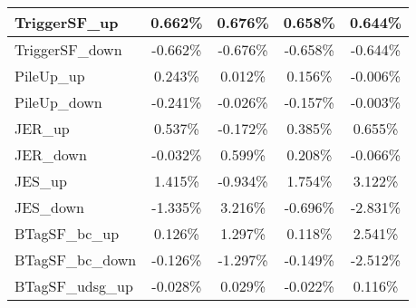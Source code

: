 \begin{table}[]
{\begin{tabular}{|l|c|c|c|c|}
TriggerSF\_up                               & 0.662\%                                & 0.676\%                                & 0.658\%                               & 0.644\%                                \\ \hline 
TriggerSF\_down                             & -0.662\%                              & -0.676\%                              & -0.658\%                             & -0.644\%                              \\ \hline 
PileUp\_up                             & 0.243\%                              & 0.012\%                              & 0.156\%                             & -0.006\%                              \\ \hline 
PileUp\_down                           & -0.241\%                            & -0.026\%                            & -0.157\%                           & -0.003\%                            \\ \hline 
JER\_up                         & 0.537\%                          & -0.172\%                          & 0.385\%                         & 0.655\%                          \\ \hline     
JER\_down                       & -0.032\%                        & 0.599\%                        & 0.208\%                       & -0.066\%                        \\ \hline    
JES\_up                                 & 1.415\%                                  & -0.934\%                                  & 1.754\%                                 & 3.122\%                                  \\ \hline    
JES\_down                               & -1.335\%                                & 3.216\%                                & -0.696\%                               & -2.831\%                                \\ \hline    
BTagSF\_bc\_up                              & 0.126\%                               & 1.297\%                               & 0.118\%                              & 2.541\%                               \\ \hline    
BTagSF\_bc\_down                            & -0.126\%                             & -1.297\%                             & -0.149\%                            & -2.512\%                             \\ \hline    
BTagSF\_udsg\_up                            & -0.028\%                             & 0.029\%                             & -0.022\%                            & 0.116\%                             \\ \hline     

\end{tabular}}
\end{table}
